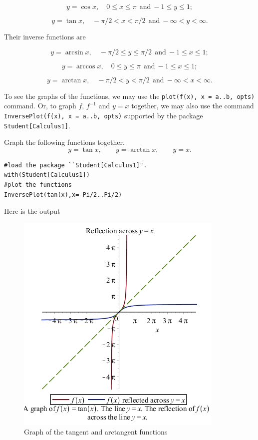 \documentclass[]{book}
\theoremstyle{definition}
\theoremstyle{definition}
\theoremstyle{definition}
\theoremstyle{remark}
\let\BeginKnitrBlock\begin \let\EndKnitrBlock\end
\begin{document}
\[
y=\cos x,\quad 0\leq x\leq \pi ~~\text{and}~ -1\leq y\leq 1;
\]

\[
y=\tan x,\quad -\pi/2< x< \pi/2 ~~\text{and}~ -\infty<y<\infty.
\]

Their inverse functions are

\[
y=\arcsin x,\quad -\pi/2\leq y\leq \pi/2 ~~\text{and}~ -1\leq x\leq 1;
\]

\[
y=\arccos x,\quad 0\leq y\leq \pi ~~\text{and}~ -1\leq x\leq 1;
\]

\[
y=\arctan x,\quad -\pi/2< y< \pi/2 ~~\text{and}~ -\infty< x<\infty.
\]

To see the graphs of the functions, we may use the \texttt{plot(f(x),\ x\ =\ a..b,\ opts)} command. Or, to graph \(f\), \(f^{-1}\) and \(y=x\) together, we may also use the command \texttt{InversePlot(f(x),\ x\ =\ a..b,\ opts)} supported by the package \texttt{Student{[}Calculus1{]}}.

\BeginKnitrBlock{example}
\protect\hypertarget{exm:unnamed-chunk-1}{}{\label{exm:unnamed-chunk-1} }
Graph the following functions together.
\[
y=\tan x, \qquad y=\arctan x, \qquad y=x.
\]
\EndKnitrBlock{example}

\BeginKnitrBlock{solution}
{}

\begin{verbatim}
#load the package ``Student[Calculus1]".
with(Student[Calculus1])
#plot the functions
InversePlot(tan(x),x=-Pi/2..Pi/2)
\end{verbatim}

Here is the output

\begin{figure}
\centering
\includegraphics{figs/InversePlot_tanx.png}
\caption{Graph of the tangent and arctangent functions}
\end{figure}
\EndKnitrBlock{solution}
\end{document}
